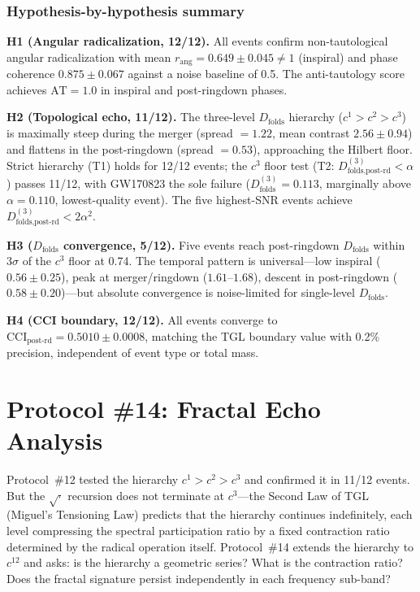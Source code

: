 \documentclass[12pt,a4paper,twocolumn]{article}
\newcommand{\alphaii}{\alpha^{2}}
\newcommand{\Dfolds}{D_{\text{folds}}}
\newcommand{\CCI}{\text{CCI}}
\begin{document}
\subsubsection{Hypothesis-by-hypothesis summary}

\textbf{H1 (Angular radicalization, 12/12).} All events confirm non-tautological angular radicalization with mean $r_{\text{ang}} = 0.649 \pm 0.045 \neq 1$ (inspiral) and phase coherence $0.875 \pm 0.067$ against a noise baseline of 0.5. The anti-tautology score achieves $\text{AT} = 1.0$ in inspiral and post-ringdown phases.

\textbf{H2 (Topological echo, 11/12).} The three-level $\Dfolds$ hierarchy ($c^1 > c^2 > c^3$) is maximally steep during the merger (spread $= 1.22$, mean contrast $2.56 \pm 0.94$) and flattens in the post-ringdown (spread $= 0.53$), approaching the Hilbert floor. Strict hierarchy (T1) holds for 12/12 events; the $c^3$ floor test (T2: $D_{\text{folds,post-rd}}^{(3)} < \alpha$) passes 11/12, with GW170823 the sole failure ($\Dfolds^{(3)} = 0.113$, marginally above $\alpha = 0.110$, lowest-quality event). The five highest-SNR events achieve $D_{\text{folds,post-rd}}^{(3)} < 2\alphaii$.

\textbf{H3 ($\Dfolds$ convergence, 5/12).} Five events reach post-ringdown $\Dfolds$ within $3\sigma$ of the $c^3$ floor at 0.74. The temporal pattern is universal---low inspiral ($0.56 \pm 0.25$), peak at merger/ringdown ($1.61$--$1.68$), descent in post-ringdown ($0.58 \pm 0.20$)---but absolute convergence is noise-limited for single-level $\Dfolds$.

\textbf{H4 (CCI boundary, 12/12).} All events converge to $\CCI_{\text{post-rd}} = 0.5010 \pm 0.0008$, matching the TGL boundary value with 0.2\% precision, independent of event type or total mass.



\section{Protocol \#14: Fractal Echo Analysis}
\label{sec:protocol14}

Protocol~\#12 tested the hierarchy $c^1 > c^2 > c^3$ and confirmed it in 11/12 events. But the $\sqrt{\cdot}$ recursion does not terminate at $c^3$---the Second Law of TGL (Miguel's Tensioning Law) predicts that the hierarchy continues indefinitely, each level compressing the spectral participation ratio by a fixed contraction ratio determined by the radical operation itself. Protocol~\#14 extends the hierarchy to $c^{12}$ and asks: is the hierarchy a geometric series? What is the contraction ratio? Does the fractal signature persist independently in each frequency sub-band?
\end{document}
